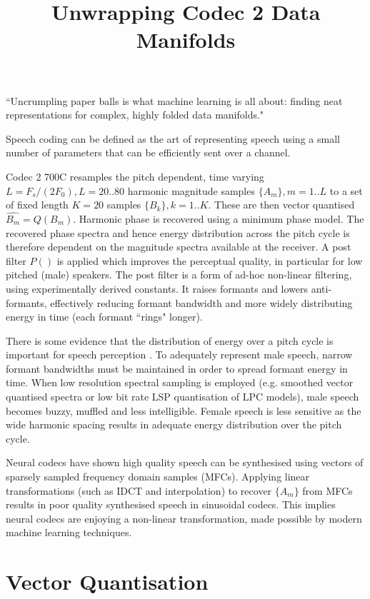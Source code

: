 \documentclass{article}
\begin{document}
\title{Unwrapping Codec 2 Data Manifolds}
\maketitle

``Uncrumpling paper balls is what machine learning is all about: finding neat representations for complex, highly folded data manifolds." \cite{chollet2018deep}

Speech coding can be defined as the art of representing speech using a small number of parameters that can be efficiently sent over a channel.

Codec 2 700C resamples the pitch dependent, time varying $L=F_s/(2F_0), L=20..80$ harmonic magnitude samples $\{A_m\}, m=1..L$ to a set of fixed length $K=20$ samples $\{B_k\},k=1..K$.  These are then vector quantised $\hat{B_m}=Q(B_m)$.  Harmonic phase is recovered using a minimum phase model. The recovered phase spectra and hence energy distribution across the pitch cycle is therefore dependent on the magnitude spectra available at the receiver. A post filter $P()$ is applied which improves the perceptual quality, in particular for low pitched (male) speakers. The post filter is a form of ad-hoc non-linear filtering, using experimentally derived constants.  It raises formants and lowers anti-formants, effectively reducing formant bandwidth and more widely distributing energy in time (each formant ``rings" longer).

There is some evidence that the distribution of energy over a pitch cycle is important for speech perception \cite{rowe2023_ratek_study}. To adequately represent male speech, narrow formant bandwidths must be maintained in order to spread formant energy in time.  When low resolution spectral sampling is employed (e.g. smoothed vector quantised spectra or low bit rate LSP quantisation of LPC models), male speech becomes buzzy, muffled and less intelligible.  Female speech is less sensitive as the wide harmonic spacing results in adequate energy distribution over the pitch cycle.

Neural codecs have shown high quality speech can be synthesised using vectors of sparsely sampled frequency domain samples (MFCs).  Applying linear transformations (such as IDCT and interpolation) to recover $\{A_m\}$ from MFCs results in poor quality synthesised speech in sinusoidal codecs.  This implies neural codecs are enjoying a non-linear transformation, made possible by modern machine learning techniques.

\section{Vector Quantisation}
\end{document}
